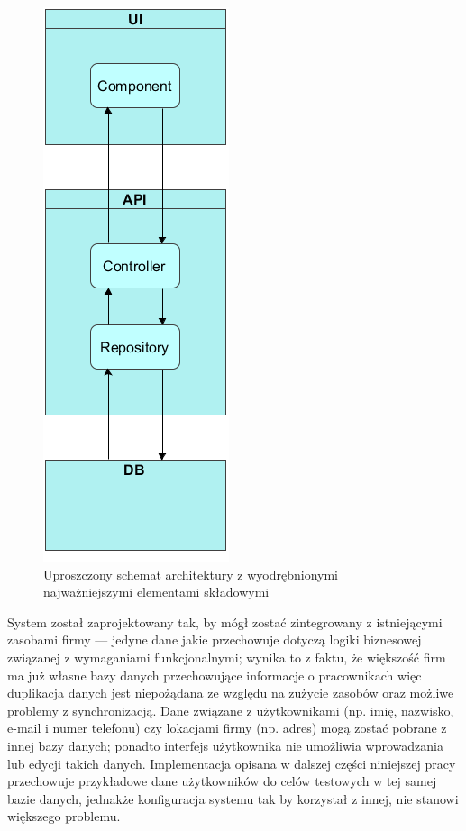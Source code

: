 \documentclass[eng,printmode,openany]{mgr}
\begin{document}
\begin{figure}[h]
	\centering
	\includegraphics[scale=0.6]{images/architecture.png}
	\caption{Uproszczony schemat architektury z wyodrębnionymi najważniejszymi elementami składowymi}
\end{figure}


System został zaprojektowany tak, by mógł zostać zintegrowany z istniejącymi zasobami firmy — jedyne dane jakie przechowuje dotyczą logiki biznesowej związanej z wymaganiami funkcjonalnymi; wynika to z faktu, że większość firm ma już własne bazy danych przechowujące informacje o pracownikach więc duplikacja danych jest niepożądana ze względu na zużycie zasobów oraz możliwe problemy z synchronizacją. Dane związane z użytkownikami (np. imię, nazwisko, e-mail i numer telefonu) czy lokacjami firmy (np. adres) mogą zostać pobrane z innej bazy danych; ponadto interfejs użytkownika nie umożliwia wprowadzania lub edycji takich danych. Implementacja opisana w dalszej części niniejszej pracy przechowuje przykładowe dane użytkowników do celów testowych w tej samej bazie danych, jednakże konfiguracja systemu tak by korzystał z innej, nie stanowi większego problemu.
\end{document}
